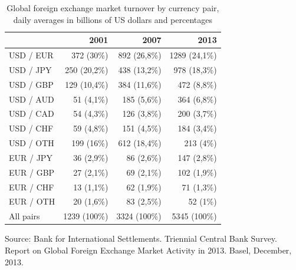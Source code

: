 \documentclass[international_finance_p1.tex]{subfiles}
\begin{document}
\begin{frame}[shrink=15]
\begin{table}[htbp]
  \centering
  \fontsize{10pt}{10pt}\selectfont  
  \caption{Global foreign exchange market turnover by currency pair,\\daily averages in billions of US dollars and percentages}
\begin{tabularx}{\linewidth}[b]{@{}>{\raggedright\arraybackslash}Xrrr@{}}
	\toprule
	          & 2001         & 2007         & 2013          \\ \midrule
	USD / EUR & 372 (30\%)   & 892 (26,8\%) & 1289 (24,1\%) \\
	USD / JPY & 250 (20,2\%) & 438 (13,2\%) & 978 (18,3\%)  \\
	USD / GBP & 129 (10,4\%) & 384 (11,6\%) & 472 (8,8\%)   \\
	USD / AUD & 51 (4,1\%)   & 185 (5,6\%)  & 364 (6,8\%)   \\
	USD / CAD & 54 (4,3\%)   & 126 (3,8\%)  & 200 (3,7\%)   \\
	USD / CHF & 59 (4,8\%)   & 151 (4,5\%)  & 184 (3,4\%)   \\
	USD / OTH & 199 (16\%)   & 612 (18,4\%) & 213 (4\%)     \\
	EUR / JPY & 36 (2,9\%)   & 86 (2,6\%)   & 147 (2,8\%)   \\
	EUR / GBP & 27 (2,1\%)   & 69 (2,1\%)   & 102 (1,9\%)   \\
	EUR / CHF & 13 (1,1\%)   & 62 (1,9\%)   & 71 (1,3\%)    \\
	EUR / OTH & 20 (1,6\%)   & 83 (2,5\%)   & 52 (1\%)      \\ \midrule
	All pairs & 1239 (100\%) & 3324 (100\%) & 5345 (100\%)  \\ \bottomrule
\end{tabularx}%
  \label{tab:addlabel}%
  
\raggedright
  \small{Source: Bank for International Settlements. Triennial Central Bank Survey. Report on Global Foreign Exchange Market Activity in 2013. Basel, December, 2013.}
\end{table}%


\end{frame}
\end{document}
